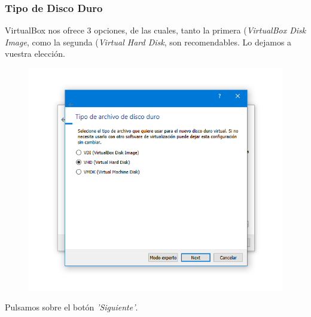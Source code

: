 \subsubsection{Tipo de Disco Duro}
\noindent
VirtualBox nos ofrece 3 opciones, de las cuales, tanto la primera (\textit{VirtualBox Disk Image}, como la segunda (\textit{Virtual Hard Disk}, son recomendables. Lo dejamos a vuestra elección.
\begin{figure}[H]
        \centering
        \includegraphics[width= 0.7 \textwidth]{Media/VB5.png}
    \end{figure}
\newline \noindent Pulsamos sobre el botón \textit{'Siguiente'}.

